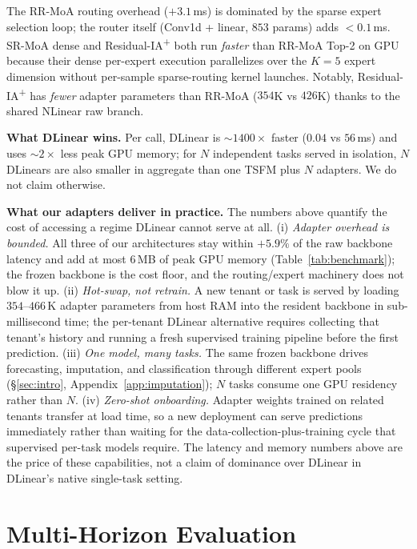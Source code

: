 \documentclass{article}
\begin{document}
The RR-MoA routing overhead ($+3.1$\,ms) is dominated by the sparse expert selection loop; the router itself (Conv1d + linear, $853$ params) adds $<0.1$\,ms. SR-MoA dense and Residual-IA\textsuperscript{+} both run \emph{faster} than RR-MoA Top-2 on GPU because their dense per-expert execution parallelizes over the $K{=}5$ expert dimension without per-sample sparse-routing kernel launches. Notably, Residual-IA\textsuperscript{+} has \emph{fewer} adapter parameters than RR-MoA ($354$K vs $426$K) thanks to the shared NLinear raw branch.

\textbf{What DLinear wins.} Per call, DLinear is ${\sim}1400\times$ faster ($0.04$ vs $56$\,ms) and uses ${\sim}2\times$ less peak GPU memory; for $N$ independent tasks served in isolation, $N$ DLinears are also smaller in aggregate than one TSFM plus $N$ adapters. We do not claim otherwise.

\textbf{What our adapters deliver in practice.} The numbers above quantify the cost of accessing a regime DLinear cannot serve at all. (i) \emph{Adapter overhead is bounded.} All three of our architectures stay within $+5.9\%$ of the raw backbone latency and add at most $6$\,MB of peak GPU memory (Table~\ref{tab:benchmark}); the frozen backbone is the cost floor, and the routing/expert machinery does not blow it up. (ii) \emph{Hot-swap, not retrain.} A new tenant or task is served by loading $354$--$466$\,K adapter parameters from host RAM into the resident backbone in sub-millisecond time; the per-tenant DLinear alternative requires collecting that tenant's history and running a fresh supervised training pipeline before the first prediction. (iii) \emph{One model, many tasks.} The same frozen backbone drives forecasting, imputation, and classification through different expert pools (\S\ref{sec:intro}, Appendix~\ref{app:imputation}); $N$ tasks consume one GPU residency rather than $N$. (iv) \emph{Zero-shot onboarding.} Adapter weights trained on related tenants transfer at load time, so a new deployment can serve predictions immediately rather than waiting for the data-collection-plus-training cycle that supervised per-task models require. The latency and memory numbers above are the price of these capabilities, not a claim of dominance over DLinear in DLinear's native single-task setting.

\section{Multi-Horizon Evaluation}
\label{app:horizon}
\end{document}
